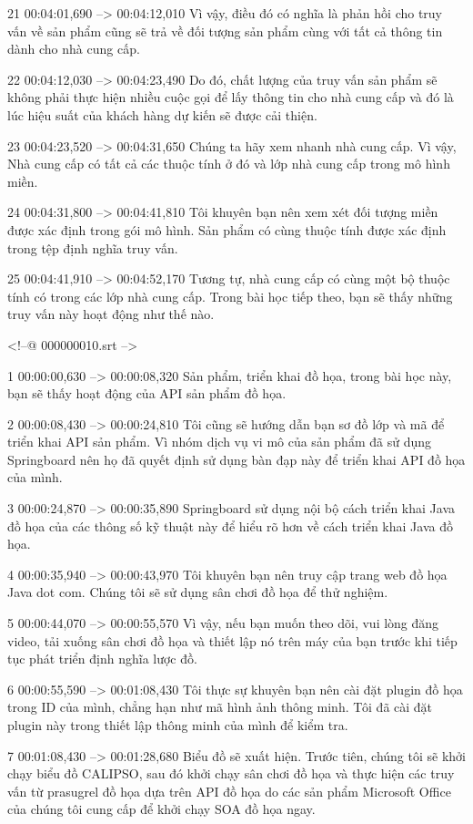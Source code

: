 21
00:04:01,690 --> 00:04:12,010
Vì vậy, điều đó có nghĩa là phản hồi cho truy vấn về sản phẩm cũng sẽ trả về đối tượng sản phẩm cùng với tất cả thông tin dành cho nhà cung cấp.

22
00:04:12,030 --> 00:04:23,490
Do đó, chất lượng của truy vấn sản phẩm sẽ không phải thực hiện nhiều cuộc gọi để lấy thông tin cho nhà cung cấp và đó là lúc hiệu suất của khách hàng dự kiến ​​sẽ được cải thiện.

23
00:04:23,520 --> 00:04:31,650
Chúng ta hãy xem nhanh nhà cung cấp.  Vì vậy, Nhà cung cấp có tất cả các thuộc tính ở đó và lớp nhà cung cấp trong mô hình miền.

24
00:04:31,800 --> 00:04:41,810
Tôi khuyên bạn nên xem xét đối tượng miền được xác định trong gói mô hình.  Sản phẩm có cùng thuộc tính được xác định trong tệp định nghĩa truy vấn.

25
00:04:41,910 --> 00:04:52,170
Tương tự, nhà cung cấp có cùng một bộ thuộc tính có trong các lớp nhà cung cấp. Trong bài học tiếp theo, bạn sẽ thấy những truy vấn này hoạt động như thế nào.

<!--@ 000000010.srt -->

1
00:00:00,630 --> 00:00:08,320
Sản phẩm, triển khai đồ họa, trong bài học này, bạn sẽ thấy hoạt động của API sản phẩm đồ họa.

2
00:00:08,430 --> 00:00:24,810
Tôi cũng sẽ hướng dẫn bạn sơ đồ lớp và mã để triển khai API sản phẩm.  Vì nhóm dịch vụ vi mô của sản phẩm đã sử dụng Springboard nên họ đã quyết định sử dụng bàn đạp này để triển khai API đồ họa của mình.

3
00:00:24,870 --> 00:00:35,890
Springboard sử dụng nội bộ cách triển khai Java đồ họa của các thông số kỹ thuật này để hiểu rõ hơn về cách triển khai Java đồ họa.

4
00:00:35,940 --> 00:00:43,970
Tôi khuyên bạn nên truy cập trang web đồ họa Java dot com.  Chúng tôi sẽ sử dụng sân chơi đồ họa để thử nghiệm.

5
00:00:44,070 --> 00:00:55,570
Vì vậy, nếu bạn muốn theo dõi, vui lòng đăng video, tải xuống sân chơi đồ họa và thiết lập nó trên máy của bạn trước khi tiếp tục phát triển định nghĩa lược đồ.

6
00:00:55,590 --> 00:01:08,430
Tôi thực sự khuyên bạn nên cài đặt plugin đồ họa trong ID của mình, chẳng hạn như mã hình ảnh thông minh.  Tôi đã cài đặt plugin này trong thiết lập thông minh của mình để kiểm tra.

7
00:01:08,430 --> 00:01:28,680
Biểu đồ sẽ xuất hiện.  Trước tiên, chúng tôi sẽ khởi chạy biểu đồ CALIPSO, sau đó khởi chạy sân chơi đồ họa và thực hiện các truy vấn từ prasugrel đồ họa dựa trên API đồ họa do các sản phẩm Microsoft Office của chúng tôi cung cấp để khởi chạy SOA đồ họa ngay.

